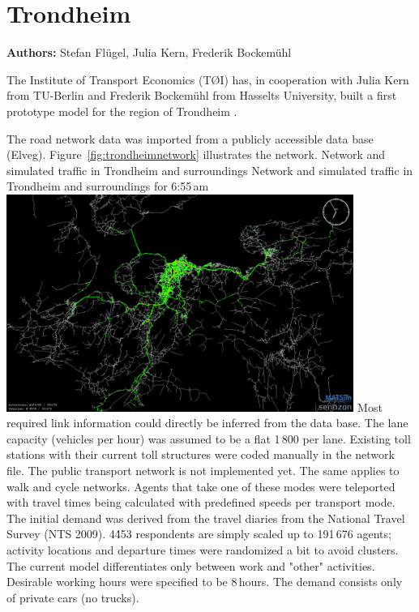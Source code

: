 \section{Trondheim}
\label{sec:trondheim}
\hfill \textbf{Authors:} Stefan Flügel, Julia Kern, Frederik Bockemühl

The Institute of Transport Economics (TØI) has, in cooperation with Julia Kern from TU-Berlin and Frederik Bockemühl from Hasselts University, built a first prototype model for the region of Trondheim \citep[][]{FluegelKern_unpub_WTS_2014}.

The road network data was imported from a publicly accessible data base (Elveg). Figure~\ref{fig:trondheimnetwork} illustrates the network. 
%
\createfigure%
{Network and simulated traffic in Trondheim and surroundings}%
{Network and simulated traffic in Trondheim and surroundings for 6:55\,am \citep[source][]{FluegelEtAl_Samferdsel_2014}}%
{\label{fig:trondheimnetwork}}%
{\includegraphics[width=0.85\textwidth, angle=0]{./using/figures/trondheimnetwork.png}}%
{}
%
Most required link information could directly be inferred from the data base. The lane capacity (vehicles per hour) was assumed to be a flat 1\,800 per lane. Existing toll stations with their current toll structures were coded manually in the network file. The public transport network is not implemented yet. The same applies to walk and cycle networks. Agents that take one of these modes were teleported with travel times being calculated with predefined speeds per transport mode. 
The initial demand was derived from the travel diaries from the National Travel Survey (NTS 2009). 4\'453 respondents are simply scaled up to 191\,676 agents; activity locations and departure times were randomized a bit to avoid clusters. The current model differentiates only between work and "other" activities. Desirable working hours were specified to be 8\,hours. The demand consists only of private cars (no trucks). 

